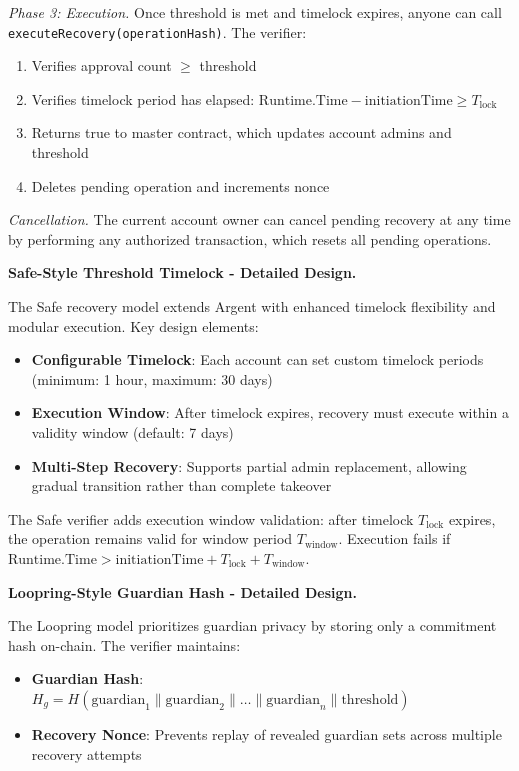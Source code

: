 \documentclass[10pt,twocolumn]{article}
\newcommand{\code}[1]{\texttt{\small #1}}
\begin{document}
\textit{Phase 3: Execution.} Once threshold is met and timelock expires, anyone can call \code{executeRecovery(operationHash)}. The verifier:
\begin{enumerate}[leftmargin=*,topsep=2pt,itemsep=1pt]
\item Verifies approval count $\geq$ threshold
\item Verifies timelock period has elapsed: $\text{Runtime.Time} - \text{initiationTime} \geq T_{\text{lock}}$
\item Returns true to master contract, which updates account admins and threshold
\item Deletes pending operation and increments nonce
\end{enumerate}

\textit{Cancellation.} The current account owner can cancel pending recovery at any time by performing any authorized transaction, which resets all pending operations.



\textbf{Safe-Style Threshold Timelock - Detailed Design.}

The Safe recovery model extends Argent with enhanced timelock flexibility and modular execution. Key design elements:

\begin{itemize}[leftmargin=*,topsep=2pt,itemsep=1pt]
\item \textbf{Configurable Timelock}: Each account can set custom timelock periods (minimum: 1 hour, maximum: 30 days)
\item \textbf{Execution Window}: After timelock expires, recovery must execute within a validity window (default: 7 days)
\item \textbf{Multi-Step Recovery}: Supports partial admin replacement, allowing gradual transition rather than complete takeover
\end{itemize}

The Safe verifier adds execution window validation: after timelock $T_{\text{lock}}$ expires, the operation remains valid for window period $T_{\text{window}}$. Execution fails if $\text{Runtime.Time} > \text{initiationTime} + T_{\text{lock}} + T_{\text{window}}$.

\textbf{Loopring-Style Guardian Hash - Detailed Design.}

The Loopring model prioritizes guardian privacy by storing only a commitment hash on-chain. The verifier maintains:

\begin{itemize}[leftmargin=*,topsep=2pt,itemsep=1pt]
\item \textbf{Guardian Hash}: $H_g = H(\text{guardian}_1 \| \text{guardian}_2 \| \ldots \| \text{guardian}_n \| \text{threshold})$
\item \textbf{Recovery Nonce}: Prevents replay of revealed guardian sets across multiple recovery attempts
\end{itemize}
\end{document}

